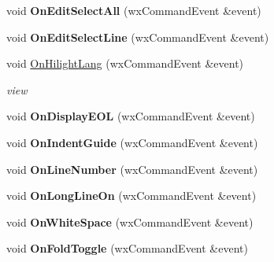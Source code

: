 \begin{DoxyCompactItemize}
\item 
\hypertarget{class_edit_a2f326c611b3f72c06c818be0b5d03632}{void {\bfseries On\+Edit\+Select\+All} (wx\+Command\+Event \&event)}\label{class_edit_a2f326c611b3f72c06c818be0b5d03632}

\item 
\hypertarget{class_edit_a80ea201355875d8e3ff9d81c020b3ca9}{void {\bfseries On\+Edit\+Select\+Line} (wx\+Command\+Event \&event)}\label{class_edit_a80ea201355875d8e3ff9d81c020b3ca9}

\item 
\hypertarget{class_edit_abd88efa68e008e6cf0a4e8ddd9368fe0}{void \hyperlink{class_edit_abd88efa68e008e6cf0a4e8ddd9368fe0}{On\+Hilight\+Lang} (wx\+Command\+Event \&event)}\label{class_edit_abd88efa68e008e6cf0a4e8ddd9368fe0}

\begin{DoxyCompactList}\small\item\em view \end{DoxyCompactList}\item 
\hypertarget{class_edit_a88467f6e3d41e6c00311a43c9f8c2a2f}{void {\bfseries On\+Display\+E\+O\+L} (wx\+Command\+Event \&event)}\label{class_edit_a88467f6e3d41e6c00311a43c9f8c2a2f}

\item 
\hypertarget{class_edit_a51bbb55708c41ded2dfa5a4d87d07978}{void {\bfseries On\+Indent\+Guide} (wx\+Command\+Event \&event)}\label{class_edit_a51bbb55708c41ded2dfa5a4d87d07978}

\item 
\hypertarget{class_edit_a8262aca5bb842786dc1dc1fc2360659e}{void {\bfseries On\+Line\+Number} (wx\+Command\+Event \&event)}\label{class_edit_a8262aca5bb842786dc1dc1fc2360659e}

\item 
\hypertarget{class_edit_a67c8747c802b8ddde2f3a1e58f457093}{void {\bfseries On\+Long\+Line\+On} (wx\+Command\+Event \&event)}\label{class_edit_a67c8747c802b8ddde2f3a1e58f457093}

\item 
\hypertarget{class_edit_a3303108fe64cfd7c5a62355fff38d727}{void {\bfseries On\+White\+Space} (wx\+Command\+Event \&event)}\label{class_edit_a3303108fe64cfd7c5a62355fff38d727}

\item 
\hypertarget{class_edit_af168157256af6f29c4c549d24707b1f1}{void {\bfseries On\+Fold\+Toggle} (wx\+Command\+Event \&event)}\label{class_edit_af168157256af6f29c4c549d24707b1f1}


\end{DoxyCompactItemize}
